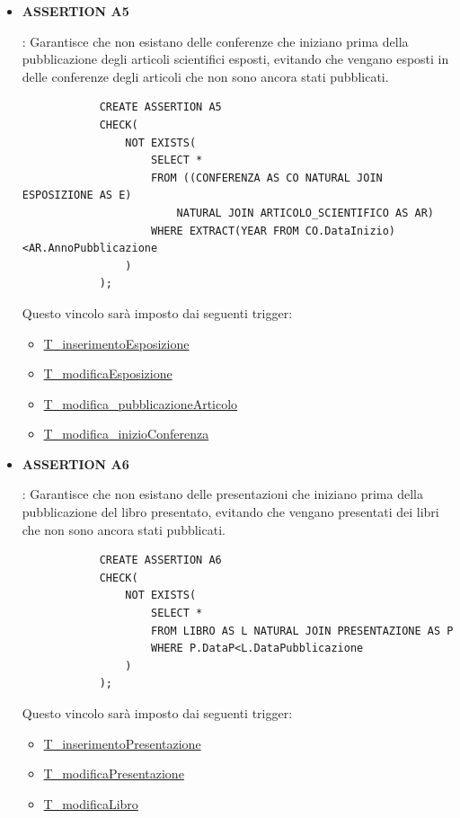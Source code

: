 \documentclass{article}
\begin{document}
\begin{itemize}
        \item \hypertarget{assertion5}{\textbf{ASSERTION A5}}: Garantisce che non esistano delle conferenze che iniziano prima della pubblicazione degli articoli scientifici esposti, evitando che vengano esposti in delle conferenze degli articoli che non sono ancora stati pubblicati.
        \begin{verbatim}
            CREATE ASSERTION A5
            CHECK(
                NOT EXISTS(
                    SELECT *
                    FROM ((CONFERENZA AS CO NATURAL JOIN ESPOSIZIONE AS E) 
                        NATURAL JOIN ARTICOLO_SCIENTIFICO AS AR) 
                    WHERE EXTRACT(YEAR FROM CO.DataInizio)<AR.AnnoPubblicazione
                )
            );
        \end{verbatim}
    Questo vincolo sarà imposto dai seguenti trigger:
        \begin{itemize}
            \item \hyperlink{t11}{T\_inserimentoEsposizione}
            \item \hyperlink{t12}{T\_modificaEsposizione}
            \item \hyperlink{t13}{T\_modifica\_pubblicazioneArticolo}
            \item \hyperlink{t14}{T\_modifica\_inizioConferenza}
        \end{itemize}   

    \item \hypertarget{assertion6}{\textbf{ASSERTION A6}}: Garantisce che non esistano delle presentazioni che iniziano prima della pubblicazione del libro presentato, evitando che vengano presentati dei libri che non sono ancora stati pubblicati.
        \begin{verbatim}
            CREATE ASSERTION A6
            CHECK(
                NOT EXISTS(
                    SELECT *
                    FROM LIBRO AS L NATURAL JOIN PRESENTAZIONE AS P  
                    WHERE P.DataP<L.DataPubblicazione
                )
            );          
        \end{verbatim}
    Questo vincolo sarà imposto dai seguenti trigger:
        \begin{itemize}
            \item \hyperlink{t15}{T\_inserimentoPresentazione}
            \item \hyperlink{t16}{T\_modificaPresentazione}
            \item \hyperlink{t17}{T\_modificaLibro}
        \end{itemize}
        

\end{itemize}
\end{document}
